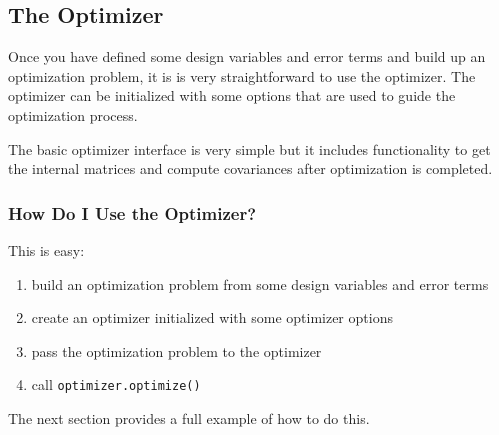 \documentclass[11pt,a4,oneside]{article}
\newcommand{\txt}[1]{{\footnotesize\texttt{#1}}}
\newcommand{\listcpp}[2]{}
\begin{document}
\subsection{The Optimizer \label{ss:Optimizer}}
Once you have defined some design variables and error terms and build up an optimization problem, it is is very straightforward to use the optimizer. The optimizer can be initialized with some options that are used to guide the optimization process.
\listcpp{OptimizerOptions.hpp}{../../aslam_backend/include/aslam/backend/OptimizerOptions.hpp}

The basic optimizer interface is very simple but it includes functionality to get the internal matrices and compute covariances after optimization is completed.
\listcpp{Optimizer.hpp}{../../aslam_backend/include/aslam/backend/Optimizer.hpp}

\subsubsection{How Do I Use the Optimizer?}
This is easy:
\begin{enumerate}
\item build an optimization problem from some design variables and error terms
\item create an optimizer initialized with some optimizer options
\item pass the optimization problem to the optimizer
\item call \txt{optimizer.optimize()}
\end{enumerate}
The next section provides a full example of how to do this.
\end{document}
